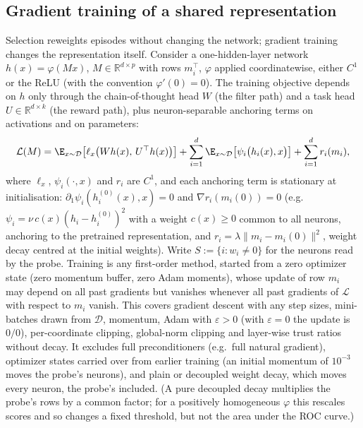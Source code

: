 \subsection{Gradient training of a shared representation}

Selection reweights episodes without changing the network; gradient training changes the representation itself. Consider a one-hidden-layer network $h(x) = \varphi(Mx)$, $M \in \mathbb{R}^{d \times p}$ with rows $m_i^\top$, $\varphi$ applied coordinatewise, either $C^1$ or the ReLU (with the convention $\varphi'(0) = 0$). The training objective depends on $h$ only through the chain-of-thought head $W$ (the filter path) and a task head $U \in \mathbb{R}^{d \times k}$ (the reward path), plus neuron-separable anchoring terms on activations and on parameters:
\begin{equation}\label{eq:train-objective}
  \mathcal{L}(M) = \E_{x \sim \mathcal{D}}\big[\ell_x\big(W h(x),\, U^\top h(x)\big)\big] + \sum_{i=1}^d \E_{x \sim \mathcal{D}}\big[\psi_i\big(h_i(x), x\big)\big] + \sum_{i=1}^d r_i(m_i),
\end{equation}
where $\ell_x$, $\psi_i(\cdot, x)$ and $r_i$ are $C^1$, and each anchoring term is stationary at initialisation: $\partial_1 \psi_i(h_i^{(0)}(x), x) = 0$ and $\nabla r_i(m_i(0)) = 0$ (e.g.\ $\psi_i = \nu\, c(x) (h_i - h_i^{(0)})^2$ with a weight $c(x) \ge 0$ common to all neurons, anchoring to the pretrained representation, and $r_i = \lambda \|m_i - m_i(0)\|^2$, weight decay centred at the initial weights). Write $S := \{i : w_i \neq 0\}$ for the neurons read by the probe. Training is any first-order method, started from a zero optimizer state (zero momentum buffer, zero Adam moments), whose update of row $m_i$ may depend on all past gradients but vanishes whenever all past gradients of $\mathcal{L}$ with respect to $m_i$ vanish. This covers gradient descent with any step sizes, mini-batches drawn from $\mathcal{D}$, momentum, Adam with $\varepsilon > 0$ (with $\varepsilon = 0$ the update is $0/0$), per-coordinate clipping, global-norm clipping and layer-wise trust ratios without decay. It excludes full preconditioners (e.g.\ full natural gradient), optimizer states carried over from earlier training (an initial momentum of $10^{-3}$ moves the probe's neurons), and plain or decoupled weight decay, which moves every neuron, the probe's included. (A pure decoupled decay multiplies the probe's rows by a common factor; for a positively homogeneous $\varphi$ this rescales scores and so changes a fixed threshold, but not the area under the ROC curve.)


